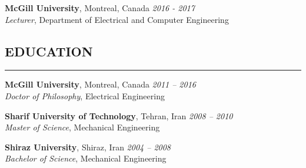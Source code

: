 \documentclass{article}
\begin{document}
\vspace{-9pt}

\noindent
\textbf{McGill University}, Montreal, Canada \hfill {\em 2016 - 2017} 
\\ \textit{Lecturer}, {Department of Electrical and Computer Engineering} \hfill %


\vspace{-8pt}


\subsection*{EDUCATION}
\vspace{-2pt}
\hrule
\vspace{6pt}


\noindent
\textbf{McGill University}, Montreal, Canada \hfill {\em 2011 -- 2016} 
\\ \textit{Doctor of Philosophy}, {Electrical Engineering} %
\newline

\vspace{-9pt}

\noindent
\textbf{Sharif University of Technology}, Tehran, Iran \hfill {\em 2008 -- 2010} 
\\ \textit{Master of Science}, Mechanical Engineering %
\newline

\vspace{-9pt}

\noindent
\textbf{Shiraz University}, Shiraz, Iran \hfill {\em 2004 -- 2008} 
\\ \textit{Bachelor of Science}, Mechanical Engineering %
\end{document}
